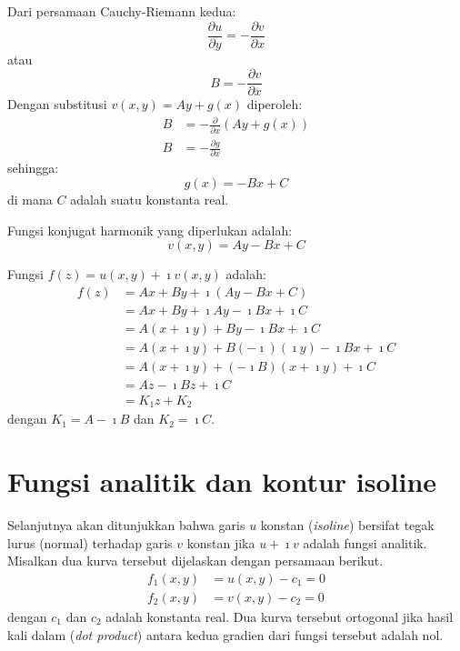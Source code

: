 Dari persamaan Cauchy-Riemann kedua:
\begin{equation*}
\frac{\partial u}{\partial y}=-\frac{\partial v}{\partial x}
\end{equation*}
atau
\begin{equation*}
B = -\frac{\partial v}{\partial x}
\end{equation*}
Dengan substitusi $v(x,y)=Ay+g(x)$ diperoleh:
\begin{align*}
B & =-\frac{\partial}{\partial x}\left(Ay+g(x)\right)\\
B & =-\frac{\partial g}{\partial x}
\end{align*}
sehingga:
\begin{equation*}
g(x)=-Bx+C
\end{equation*}
di mana $C$ adalah suatu konstanta real.

Fungsi konjugat harmonik yang diperlukan adalah:
\begin{equation*}
v(x,y) = Ay - Bx + C
\end{equation*}

Fungsi $f(z) = u(x,y) + \imath v(x,y)$ adalah:
\begin{align*}
f(z) & = Ax + By+\imath\left(Ay - Bx + C\right)\\
 & =Ax+By+\imath Ay-\imath Bx + \imath C\\
 & =A(x+\imath y) + By-\imath Bx + \imath C\\
 & =A(x+\imath y) + B(-\imath)(\imath y) - \imath Bx+\imath C\\
 & =A(x+\imath y) + (-\imath B)(x + \imath y) + \imath C\\
 & =Az - \imath Bz + \imath C\\
 & =K_{1}z + K_{2}
\end{align*}
dengan $K_{1}=A-\imath B$ dan $K_{2}=\imath C$.



\section{Fungsi analitik dan kontur isoline}

Selanjutnya akan ditunjukkan bahwa garis $u$ konstan (\textit{isoline}) bersifat tegak lurus (normal)
terhadap garis $v$ konstan jika $u + \imath v$ adalah fungsi analitik.
Misalkan dua kurva tersebut dijelaskan dengan persamaan berikut.
\begin{align*}
f_{1}(x,y) & = u(x,y) - c_{1} = 0\\
f_{2}(x,y) & = v(x,y) - c_{2} = 0
\end{align*}
dengan $c_1$ dan $c_2$ adalah konstanta real.
Dua kurva tersebut ortogonal jika hasil kali dalam (\textit{dot product}) antara kedua gradien
dari fungsi tersebut adalah nol.

